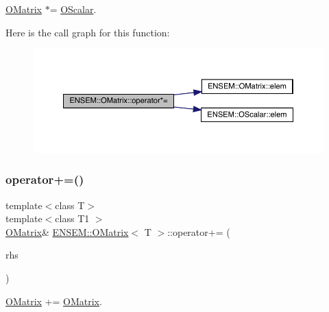 \mbox{\hyperlink{classENSEM_1_1OMatrix}{O\+Matrix}} $\ast$= \mbox{\hyperlink{classENSEM_1_1OScalar}{O\+Scalar}}. 

Here is the call graph for this function\+:
\nopagebreak
\begin{figure}[H]
\begin{center}
\leavevmode
\includegraphics[width=350pt]{dd/d80/classENSEM_1_1OMatrix_a40e18b83c9eb609f7529e65c515010c2_cgraph}
\end{center}
\end{figure}
\mbox{\label{classENSEM_1_1OMatrix_a221eb5f9e17402ad93c829fcaf2ac60a}} 
\subsubsection{\texorpdfstring{operator+=()}{operator+=()}\hspace{0.1cm}{\footnotesize\ttfamily [1/4]}}
{\footnotesize\ttfamily template$<$class T$>$ \\
template$<$class T1 $>$ \\
\mbox{\hyperlink{classENSEM_1_1OMatrix}{O\+Matrix}}\& \mbox{\hyperlink{classENSEM_1_1OMatrix}{E\+N\+S\+E\+M\+::\+O\+Matrix}}$<$ T $>$\+::operator+= (\begin{DoxyParamCaption}\item[{const \mbox{\hyperlink{classENSEM_1_1OMatrix}{O\+Matrix}}$<$ T1 $>$ \&}]{rhs }\end{DoxyParamCaption})\hspace{0.3cm}{\ttfamily [inline]}}



\mbox{\hyperlink{classENSEM_1_1OMatrix}{O\+Matrix}} += \mbox{\hyperlink{classENSEM_1_1OMatrix}{O\+Matrix}}. 


